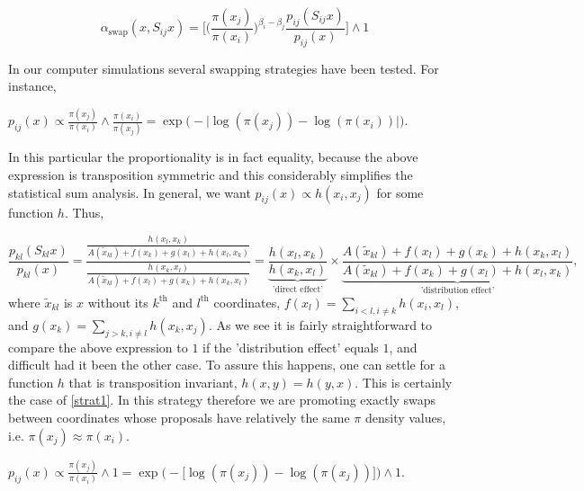 \begin{equation*}
	\alpha_\text{swap}(x,S_{ij} x) = \Big[  \Big(\frac{\pi(x_j)}{\pi(x_i)} \Big)^{\beta_i - \beta_j}  \frac{ p_{ij}(S_{ij} x )}{ p_{ij}( x ) }\Big] \wedge 1
\end{equation*}	

In our computer simulations several swapping strategies have been tested. For instance,

\begin{strategy}
	\item 
		$
			p_{ij}(x) \propto 
			\frac{\pi (x_j)}{\pi( x_i )} \wedge \frac{\pi (x_i)}{\pi( x_j )} = 
			\exp \Big( - \big| \log ( \pi(x_j) ) - \log ( \pi(x_i) ) \big| \Big).
		$\label{strat1} 
\end{strategy}

In this particular the proportionality is in fact equality, because the above expression is transposition symmetric and this considerably simplifies the statistical sum analysis. In general, we want $p_{ij}(x) \propto h(x_i,x_j)$ for some function $h$. Thus,

\begin{equation*}
	\frac{p_{kl}(S_{kl}x)}{p_{kl}(x)} = \frac{\frac{h(x_l,x_k)}{A(\tilde{x}_{kl})+f(x_k)+g(x_l)+h(x_l,x_k)}}{
	\frac{h(x_k,x_l)}{A(\tilde{x}_{kl})+f(x_l)+g(x_k)+h(x_k,x_l)}
	} = 
	\underbrace{\frac{h(x_l,x_k)}{h(x_k,x_l)}}_\text{'direct effect'} 
	\times 
	\underbrace{\frac{A(\tilde{x}_{kl})+f(x_l)+g(x_k)+h(x_k,x_l)}{A(\tilde{x}_{kl})+f(x_k)+g(x_l)+h(x_l,x_k)}}_\text{'distribution effect'},	 	 	
\end{equation*}  
where $\tilde{x}_{kl}$ is $x$ without its $k^\text{th}$ and $l^\text{th}$ coordinates, $f(x_l) = \sum_{i<l, i\not=k} h(x_i, x_l)$, and $g(x_k) = \sum_{j>k, i\not=l}h(x_k, x_j)$. As we see it is fairly straightforward to compare the above expression to $1$ if the 'distribution effect' equals $1$, and difficult had it been the other case. To assure this happens, one can settle for a function $h$ that is transposition invariant, $h(x,y)=h(y,x)$. This is certainly the case of \ref{strat1}. In this strategy therefore we are promoting exactly swaps between coordinates whose proposals have relatively the same $\pi$ density values, i.e. $\pi (x_j) \approx \pi (x_i)$. 



\begin{strategy}[resume]
	\item 
		$
			p_{ij}(x) \propto 
			\frac{\pi (x_j)}{\pi (x_i)} \wedge 1 = 
			\exp \Big( - \big[ \log ( \pi(x_j) ) - \log ( \pi(x_j) ) \big]\Big) \wedge 1.$\label{strat2}
\end{strategy}


